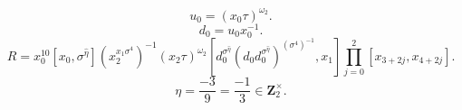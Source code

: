 \[u_0=(x_0\tau)^{\omega_2}.\]
\[d_0=u_0x_0^{-1}.\]
\[R=x_0^{10}[x_0,\sigma^{\widehat{\eta}}](x_2^{x_1\sigma^4})^{-1}(x_2\tau)^{\omega_2}[d_0^{\sigma^{\widehat{\eta}}}(d_0d_0^{\sigma^{\widehat{\eta}}})^{(\sigma^4)^{-1}},x_1]\prod_{j=0}^2[x_{3+2j},x_{4+2j}].\]
\[\eta=\frac{-3}{9}=\frac{-1}{3}\in\mathbf Z_2^\times.\]
